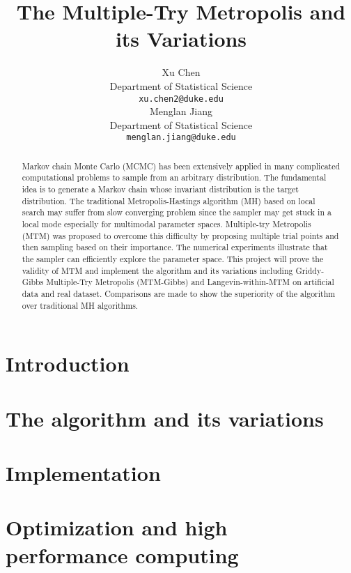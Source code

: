 \documentclass{article} %
\title{The Multiple-Try Metropolis and its Variations}
\author{
Xu Chen\\
Department of Statistical Science\\
\texttt{xu.chen2@duke.edu} \\
\And
Menglan Jiang\\
Department of Statistical Science\\
\texttt{menglan.jiang@duke.edu}
}
\begin{document}
\maketitle

\begin{abstract}
Markov chain Monte Carlo (MCMC) has been extensively applied in many complicated computational problems to sample from an arbitrary distribution. The fundamental idea is to generate a Markov chain whose invariant distribution is the target distribution. The traditional Metropolis-Hastings algorithm (MH) based on local search may suffer from slow converging problem since the sampler may get stuck in a local mode especially for multimodal parameter spaces. Multiple-try Metropolis (MTM) was proposed to overcome this difficulty by proposing multiple trial points and then sampling based on their importance. The numerical experiments illustrate that the sampler can efficiently explore the parameter space. This project will prove the validity of MTM and implement the algorithm and its variations including Griddy-Gibbs Multiple-Try Metropolis (MTM-Gibbs) and Langevin-within-MTM on artificial data and real dataset. Comparisons are made to show the superiority of the algorithm over traditional MH algorithms.
\end{abstract}

\section{Introduction}

\subsection{}

\subsection{}

\section{The algorithm and its variations}


\section{Implementation}



\section{Optimization and high performance computing}
\end{document}
